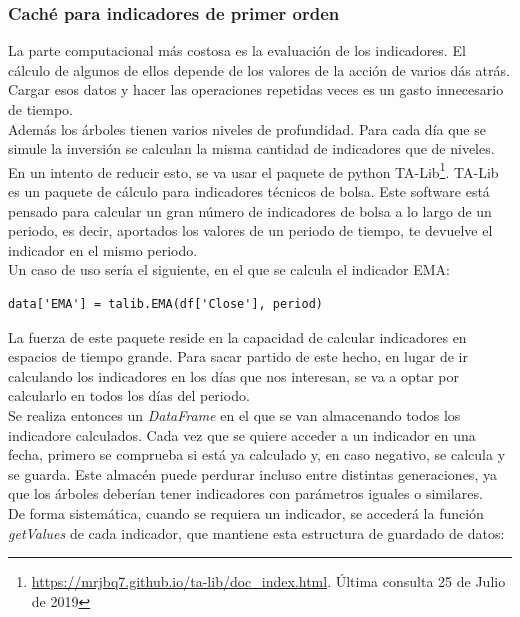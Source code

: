 \subsubsection{Cach\'e para indicadores de primer orden}
La parte computacional m\'as costosa es la evaluaci\'on de los indicadores. El c\'alculo de algunos de ellos depende de los valores de la acci\'on de varios d\'as atr\'as. Cargar esos datos y hacer las operaciones repetidas veces es un gasto innecesario de tiempo.\\

Adem\'as los \'arboles tienen varios niveles de profundidad. Para cada d\'ia que se simule la inversi\'on se calculan la misma cantidad de indicadores que de niveles.\\

En un intento de reducir esto, se va usar el paquete de python TA-Lib\footnote{\url{https://mrjbq7.github.io/ta-lib/doc_index.html}. \'Ultima consulta 25 de Julio de 2019}.
TA-Lib es un paquete de c\'alculo para indicadores t\'ecnicos de bolsa. Este software est\'a pensado para calcular un gran n\'umero de indicadores de bolsa a lo largo de un periodo, es decir, aportados los valores de un periodo de tiempo, te devuelve el indicador en el mismo periodo.\\

Un caso de uso ser\'ia el siguiente, en el que se calcula el indicador EMA:\\

\begin{lstlisting}
data['EMA'] = talib.EMA(df['Close'], period)
\end{lstlisting}

La fuerza de este paquete reside en la capacidad de calcular indicadores en espacios de tiempo grande. Para sacar partido de este hecho, en lugar de ir calculando los indicadores en los d\'ias que nos interesan, se va a optar por calcularlo en todos los d\'ias del periodo.\\

Se realiza entonces un \textit{DataFrame} en el que se van almacenando todos los indicadore calculados. Cada vez que se quiere acceder a un indicador en una fecha, primero se comprueba si est\'a ya calculado y, en caso negativo, se calcula y se guarda. Este almac\'en puede perdurar incluso entre distintas generaciones, ya que los \'arboles deber\'ian tener indicadores con par\'ametros iguales o similares.\\ 

De forma sistem\'atica, cuando se requiera un indicador, se acceder\'a la funci\'on \textit{getValues} de cada indicador, que mantiene esta estructura de guardado de datos:\\

